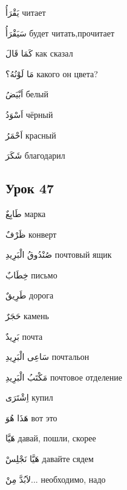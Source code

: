 \documentclass[a5paper]{article}
\newcommand\textstyleDropCaps[1]{#1}
\newcommand\textstyleCaptioncharacters[1]{#1}
\begin{document}
\textstyleCaptioncharacters{يَقْرَأُ }\textstyleDropCaps{читает‎}

\textstyleCaptioncharacters{سَيَقْرَأُ }\textstyleDropCaps{будет читать,про­читает‎}

\textstyleCaptioncharacters{كَمَا قَالَ }\textstyleDropCaps{как сказал‎}

\textstyleCaptioncharacters{مَا لَوْنُهُ؟ }\textstyleDropCaps{какого он цвета?‎}

\textstyleCaptioncharacters{اَبْيَضُ }\textstyleDropCaps{белый‎}

\textstyleCaptioncharacters{اَسْوَدُ }\textstyleDropCaps{чёрный‎}

\textstyleCaptioncharacters{اَحْمَرُ }\textstyleDropCaps{красный‎}

\textstyleCaptioncharacters{شَكَرَ }\textstyleDropCaps{благодарил‎}

\subsection[Урок 47‎]{\textstyleDropCaps{Урок 47‎}}
\textstyleCaptioncharacters{طَابِعٌ }\textstyleDropCaps{марка‎}

\textstyleCaptioncharacters{ظَرْفٌ }\textstyleDropCaps{конверт‎}

\textstyleCaptioncharacters{صُنْدُوقُ الْبَرِيدِ }\textstyleDropCaps{почто­вый ящик‎}

\textstyleCaptioncharacters{خِطَابٌ }\textstyleDropCaps{письмо‎}

\textstyleCaptioncharacters{طَرِيقٌ }\textstyleDropCaps{дорога‎}

\textstyleCaptioncharacters{حَجَرٌ }\textstyleDropCaps{камень‎}

\textstyleCaptioncharacters{بَرِيدٌ }\textstyleDropCaps{почта‎}

\textstyleCaptioncharacters{سَاعِى الْبَرِيدِ }\textstyleDropCaps{почтальон‎}

\textstyleCaptioncharacters{مَكْتَبُ الْبَرِيدِ }\textstyleDropCaps{почтовое отделение‎}

\textstyleCaptioncharacters{اِشْتَرَى }\textstyleDropCaps{купил‎}

\textstyleCaptioncharacters{هَذَا هُوَ }\textstyleDropCaps{вот это‎}

\textstyleCaptioncharacters{هَيَّا }\textstyleDropCaps{давай, пошли, скорее‎}

\textstyleCaptioncharacters{هَيَّا نَجْلِسْ }\textstyleDropCaps{давайте ся­дем‎}

\textstyleCaptioncharacters{لاَبُدَّ مِنْ...ِ }\textstyleDropCaps{необходимо, надо‎}
\end{document}

